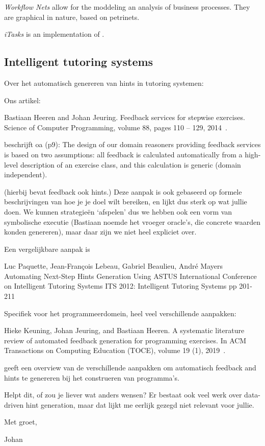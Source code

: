 \emph{Workflow Nets} allow for the moddeling an analysis of business processes.
They are graphical in nature, based on petrinets.

\emph{iTasks} is an implementation of \TOP.



\subsection{Intelligent tutoring systems}

Over het automatisch genereren van hints in tutoring systemen:

Ons artikel:

Bastiaan Heeren and Johan Jeuring. Feedback services for stepwise exercises. Science of Computer Programming, volume 88, pages 110 – 129, 2014~\cite{DBLP:journals/scp/HeerenJ14}.

beschrijft oa (p9): The design of our domain reasoners providing feedback services is based on two assumptions: all feedback is calculated automatically from a high-level description of an exercise class, and this calculation is generic (domain independent).

(hierbij bevat feedback ook hints.) Deze aanpak is ook gebaseerd op formele beschrijvingen van hoe je je doel wilt bereiken, en lijkt dus sterk op wat jullie doen. We kunnen strategieën `afspelen’ dus we hebben ook een vorm van symbolische executie (Bastiaan noemde het vroeger oracle’s, die concrete waarden konden genereren), maar daar zijn we niet heel expliciet over.

Een vergelijkbare aanpak is

Luc Paquette, Jean-François Lebeau, Gabriel Beaulieu, André Mayers
Automating Next-Step Hints Generation Using ASTUS
International Conference on Intelligent Tutoring Systems
ITS 2012: Intelligent Tutoring Systems pp 201-211~\cite{DBLP:conf/its/PaquetteLBM12}

Specifiek voor het programmeerdomein, heel veel verschillende aanpakken:

Hieke Keuning, Johan Jeuring, and Bastiaan Heeren. A systematic literature review of automated feedback generation for programming exercises. In ACM Transactions on Computing Education (TOCE), volume 19 (1), 2019~\cite{DBLP:journals/jeric/KeuningJH19}.

geeft een overview van de verschillende aanpakken om automatisch feedback and hints te genereren bij het construeren van programma’s.

Helpt dit, of zou je liever wat anders wensen? Er bestaat ook veel werk over data-driven hint generation, maar dat lijkt me eerlijk gezegd niet relevant voor jullie.

Met groet,

Johan
